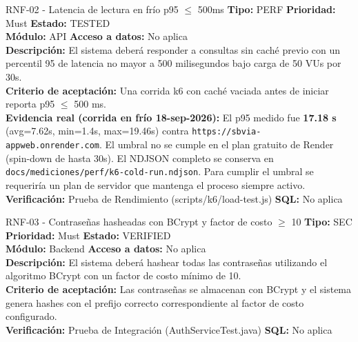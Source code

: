 \documentclass[11pt,a4paper]{article}
\begin{document}
\begin{requisito}{RNF-02 - Latencia de lectura en frío p95 $\le$ 500ms}
    \textbf{Tipo:} PERF \quad \textbf{Prioridad:} Must \quad \textbf{Estado:} TESTED \\[0.2cm]
    \textbf{Módulo:} API \quad \textbf{Acceso a datos:} No aplica \\[0.2cm]
    \textbf{Descripción:} El sistema deberá responder a consultas sin caché previo con un percentil 95 de latencia no mayor a 500 milisegundos bajo carga de 50 VUs por 30s. \\[0.2cm]
    \textbf{Criterio de aceptación:} Una corrida k6 con caché vaciada antes de iniciar reporta p95 $\leq$ 500 ms. \\[0.2cm]
    \textbf{Evidencia real (corrida en frío 18-sep-2026):} El p95 medido fue \textbf{17.18 s} (avg=7.62s, min=1.4s, max=19.46s) contra \texttt{https://sbvia-appweb.onrender.com}. El umbral no se cumple en el plan gratuito de Render (spin-down de hasta 30s). El NDJSON completo se conserva en \texttt{docs/mediciones/perf/k6-cold-run.ndjson}. Para cumplir el umbral se requeriría un plan de servidor que mantenga el proceso siempre activo. \\[0.2cm]
    \textbf{Verificación:} Prueba de Rendimiento (scripts/k6/load-test.js) \quad \textbf{SQL:} No aplica
\end{requisito}

\begin{requisito}{RNF-03 - Contraseñas hasheadas con BCrypt y factor de costo $\ge$ 10}
    \textbf{Tipo:} SEC \quad \textbf{Prioridad:} Must \quad \textbf{Estado:} VERIFIED \\[0.2cm]
    \textbf{Módulo:} Backend \quad \textbf{Acceso a datos:} No aplica \\[0.2cm]
    \textbf{Descripción:} El sistema deberá hashear todas las contraseñas utilizando el algoritmo BCrypt con un factor de costo mínimo de 10. \\[0.2cm]
    \textbf{Criterio de aceptación:} Las contraseñas se almacenan con BCrypt y el sistema genera hashes con el prefijo correcto correspondiente al factor de costo configurado. \\[0.2cm]
    \textbf{Verificación:} Prueba de Integración (AuthServiceTest.java) \quad \textbf{SQL:} No aplica
\end{requisito}
\end{document}
